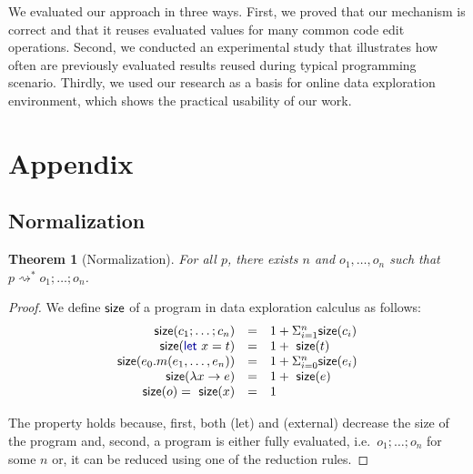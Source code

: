 \documentclass[english,submission]{programming}
\newcounter{thc}
\theoremstyle{plain}
\newtheorem{theorem}[thc]{Theorem}
\theoremstyle{definition}
\newcommand{\ident}[1]{\textnormal{\textcolor{idclr}{\sffamily #1}}}
\newcommand{\kvd}[1]{\textnormal{\textcolor{kvdclr}{\sffamily #1}}}
\newcommand{\rname}[1]{{\sffamily(#1)}}
\begin{document}
We evaluated our approach in three ways. First, we proved that our mechanism is correct and
that it reuses evaluated values for many common code edit operations. Second, we conducted an
experimental study that illustrates how often are previously evaluated results reused during
typical programming scenario. Thirdly, we used our research as a basis for online data exploration
environment, which shows the practical usability of our work.


\printbibliography


\newpage
\appendix

\section{Appendix}

\subsection{Normalization}
\label{sec:app-normalization}

\begin{theorem}[Normalization]
For all $p$, there exists $n$ and $o_1, \ldots, o_n$ such that $p\rightsquigarrow^{*} o_1;\ldots;o_n$.
\end{theorem}
\begin{proof}
We define $\ident{size}$ of a program in data exploration calculus as follows:
\begin{equation}
\begin{array}{rcl}
\ident{size}(c_1; \ldots; c_n) &=& 1 + \Sigma^{n}_{i=1} \ident{size}(c_i)\\
\ident{size}(\kvd{let}~x=t) &=& 1 + \ident{size}(t)\\
\ident{size}(e_0.m(e_1, \ldots, e_n)) &=& 1 + \Sigma^{n}_{i=0} \ident{size}(e_i)\\
\ident{size}(\lambda x\rightarrow e) &=& 1 + \ident{size}(e)\\
\ident{size}(o) = \ident{size}(x) &=& 1\\
\end{array}
\end{equation}

\noindent
The property holds because, first, both \rname{let} and \rname{external} decrease the \ident{size}
of the program and, second, a program is either fully evaluated, i.e.~$o_1;\ldots;o_n$ for some $n$
or, it can be reduced using one of the reduction rules.
\end{proof}
\end{document}
